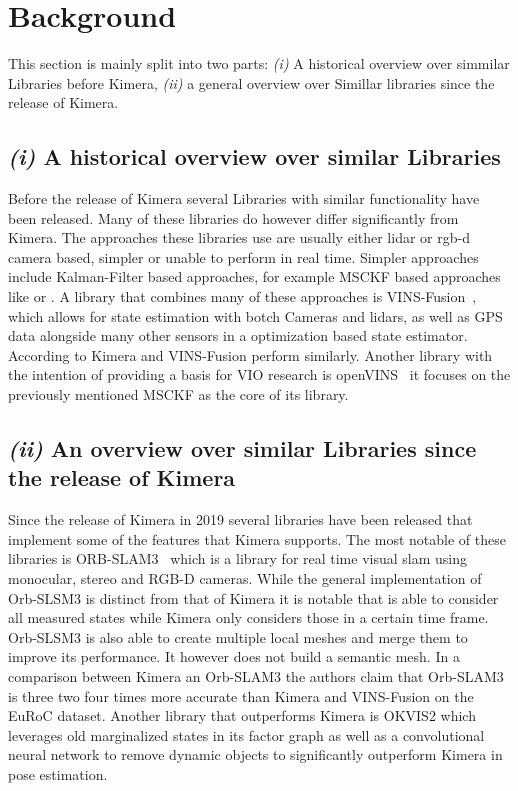 \documentclass[11pt,a4paper]{article}
\begin{document}
\section{Background} \label{Sec:background}
This section is mainly split into two parts: \emph{(i)} A historical overview over simmilar Libraries before Kimera, \emph{(ii)} a general overview over Simillar libraries since the release of Kimera.
\subsection*{\emph{(i)} A historical overview over similar Libraries}
Before the release of Kimera several Libraries with similar functionality have been released. 
Many of these libraries do however differ significantly from Kimera.
The approaches these libraries use are usually either lidar or rgb-d camera based, simpler or unable to perform in real time. 
Simpler approaches include Kalman-Filter based approaches, for example MSCKF based approaches like 
\cite{MSCKF} or \cite{sun2018robust}. 
A library that combines many of these approaches is VINS-Fusion~\cite{qin2019b}, which allows for state estimation with botch Cameras and lidars, as well as GPS data alongside many other sensors in a optimization based state estimator. 
According to \cite{ORBSLAM3} Kimera and VINS-Fusion perform similarly.
Another library with the intention of providing a basis for VIO research is openVINS~\cite{Geneva2020ICRA} it focuses on the previously mentioned MSCKF as the core of its library. 

\subsection*{\emph{(ii)} An overview over similar Libraries since the release of Kimera}
Since the release of Kimera in 2019 several libraries have been released that implement some of the features that Kimera supports.
The most notable of these libraries is ORB-SLAM3~\cite{ORBSLAM3} which is a library for real time visual slam using monocular, stereo and RGB-D cameras. 
While the general implementation of Orb-SLSM3 is distinct from that of Kimera it is notable that is able to consider all measured states while Kimera only considers those in a certain time frame. 
Orb-SLSM3 is also able to create multiple local meshes and merge them to improve its performance.
It however does not build a semantic mesh. 
In a comparison between Kimera an Orb-SLAM3 the authors claim that Orb-SLAM3 is three two four times more accurate than Kimera and VINS-Fusion on the EuRoC dataset. 
Another library that outperforms Kimera is OKVIS2 \cite{leutenegger2022okvis2} which leverages old marginalized states in its factor graph as well as a convolutional neural network to remove dynamic objects to significantly outperform Kimera in pose estimation. 
\end{document}
